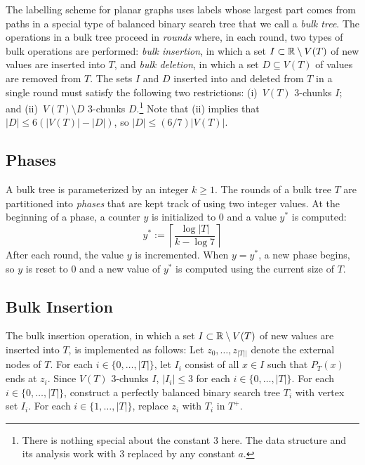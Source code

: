 \documentclass[kpfonts]{patmorin}
\newcommand{\snote}[1]{\fcolorbox{red}{yellow}{#1}}
\let\le\leqslant
\let\ge\geqslant
\begin{document}
The labelling scheme for planar graphs uses labels whose largest part comes from paths in a special type of balanced binary search tree that we call a \emph{bulk tree}.  The operations in a bulk tree proceed in \emph{rounds} where, in each round, two types of bulk operations are performed: \emph{bulk insertion}, in which a set $I\subset \mathbb{R}\setminus V(T)$ of new values are inserted into $T$, and \emph{bulk deletion}, in which a set $D\subseteq V(T)$ of values are removed from $T$. The sets $I$ and $D$ inserted into and deleted from $T$ in a single round must satisfy the following two restrictions: (i)~$V(T)$ $3$-chunks $I$; and (ii)~$V(T)\setminus D$ 3-chunks $D$.\footnote{There is nothing special about the constant $3$ here.  The data structure and its analysis work with $3$ replaced by any constant $a$.}  Note that (ii) implies that $|D|\le 6(|V(T)|-|D|)$, so $|D|\le (6/7)|V(T)|$.

\subsection{Phases}\label{sec:3.1}

A bulk tree is parameterized by an integer $k\ge 1$.  The rounds of a bulk tree $T$ are partitioned into \emph{phases} that are kept track of using two integer values.
At the beginning of a phase, a counter $y$ is initialized to $0$ and a value $y^*$ is computed:
\[  
  y^* := \left\lceil \frac{\log|T|}{k-\log 7}\right\rceil 
\]
After each round, the value $y$ is incremented.  When $y=y^*$, a new phase begins, so $y$ is reset to 0 and a new value of $y^*$ is computed using the current size of $T$.

\subsection{Bulk Insertion}

The bulk insertion operation, in which a set $I\subset  \mathbb{R}\setminus V(T)$ of new values are inserted into $T$, is implemented as follows: Let $z_0,\ldots,z_{|T||}$ denote the external nodes of $T$.  For each $i\in\{0,\ldots,|T|\}$, let $I_i$ consist of all $x\in I$ such that $P_T(x)$ ends at $z_i$. 
Since $V(T)$ $3$-chunks $I$, $|I_i|\le 3$ for each $i\in\{0,\ldots,|T|\}$. For each $i\in\{0,\ldots,|T|\}$, construct a perfectly balanced binary search tree $T_i$ with vertex set $I_i$. For each $i\in\{1,\ldots,|T|\}$, replace $z_i$ with $T_i$ in $T^+$.
\end{document}
